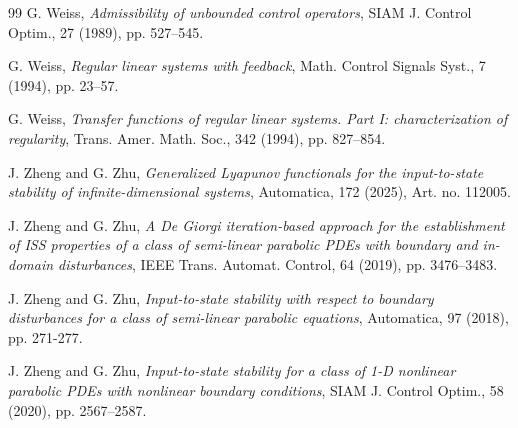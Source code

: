 \documentclass[onecolumn]{autart}
\numberwithin{equation}{section}
\begin{document}
\begin{thebibliography}{99}
		G. Weiss, \emph{Admissibility of unbounded control operators}, SIAM J. Control Optim., 27 (1989), pp.  527--545.
	
		G. Weiss, \emph{Regular linear systems with feedback}, Math. Control Signals Syst., 7 (1994), pp. 23--57.
		
		G. Weiss, \emph{Transfer functions of regular linear systems. Part I: characterization of regularity}, Trans. Amer. Math. Soc., 342 (1994), pp. 827--854.
		
		J. Zheng and G. Zhu, \emph{Generalized Lyapunov functionals for the input-to-state stability of infinite-dimensional systems}, Automatica, 172 (2025), Art. no. 112005.
		
		J. Zheng and G. Zhu, \emph{A De Giorgi iteration-based approach for the establishment of ISS properties of a class of semi-linear parabolic PDEs with boundary and in-domain disturbances}, IEEE Trans. Automat. Control, 64 (2019), pp. 3476--3483.
		
		J. Zheng and G. Zhu, \emph{Input-to-state stability with respect to boundary disturbances for a class of semi-linear parabolic equations}, Automatica, 97 (2018), pp. 271-277.

		 
		
		J. Zheng and G. Zhu, \emph{Input-to-state stability for a class of 1-D nonlinear parabolic PDEs with nonlinear boundary conditions}, SIAM J. Control Optim., 58 (2020), pp. 2567--2587.
		
		
		
	\end{thebibliography}
\end{document}
